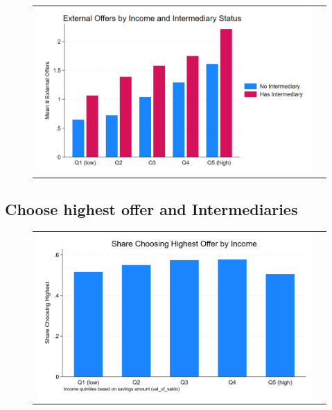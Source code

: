 \documentclass[12pt]{article}
\begin{document}
 
  

  \begin{figure}[H]
\caption{}
 \label{fig:ie4_11}
\centering{}%
\begin{tabular}{cc}
\includegraphics[scale=0.27]{figures/IE4/IE4_external_by_income_intermediary.png} 
\end{tabular}
\end{figure} 

\newpage

\subsection{Choose highest offer and Intermediaries}
 



  \begin{figure}[H]
\caption{}
 \label{fig:ie4_12}
\centering{}%
\begin{tabular}{cc}
\includegraphics[scale=0.27]{figures/IE4/IE4_highest_by_income.png} 
\end{tabular}
\end{figure} 
\end{document}
